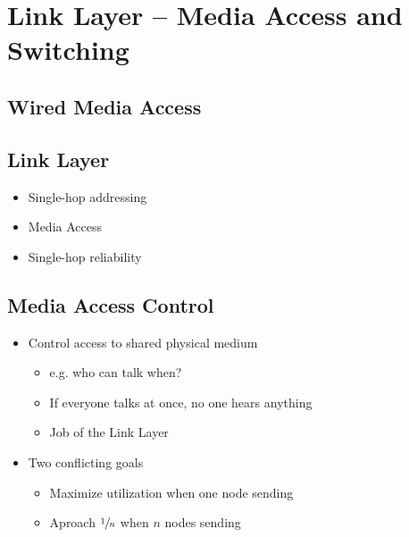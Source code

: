 \section{Link Layer -- Media Access and Switching}
\subsection{Wired Media Access}
\begin{figure}[H]
\end{figure}

\subsection{Link Layer}
\begin{itemize}
    \item Single-hop addressing
    \item Media Access
    \item Single-hop reliability
\end{itemize}

\subsection{Media Access Control}
\begin{itemize}
    \item Control access to shared physical medium
          \begin{itemize}
              \item e.g. who can talk when?
              \item If everyone talks at once, no one hears anything
              \item Job of the Link Layer
          \end{itemize}
    \item Two conflicting goals
          \begin{itemize}
              \item Maximize utilization when one node sending
              \item Aproach $\sfrac{1}{n}$ when $n$ nodes sending
          \end{itemize}
\end{itemize}

